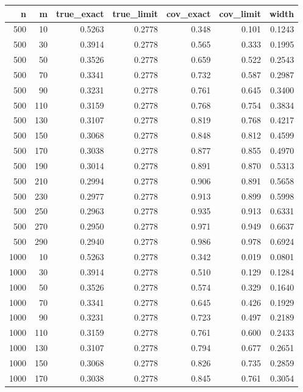 \begin{tabular}{rrrrrrr}
  \hline
n & m & true\_exact & true\_limit & cov\_exact & cov\_limit & width \\ 
  \hline
500 & 10 & 0.5263 & 0.2778 & 0.348 & 0.101 & 0.1243 \\ 
  500 & 30 & 0.3914 & 0.2778 & 0.565 & 0.333 & 0.1995 \\ 
  500 & 50 & 0.3526 & 0.2778 & 0.659 & 0.522 & 0.2543 \\ 
  500 & 70 & 0.3341 & 0.2778 & 0.732 & 0.587 & 0.2987 \\ 
  500 & 90 & 0.3231 & 0.2778 & 0.761 & 0.645 & 0.3400 \\ 
  500 & 110 & 0.3159 & 0.2778 & 0.768 & 0.754 & 0.3834 \\ 
  500 & 130 & 0.3107 & 0.2778 & 0.819 & 0.768 & 0.4217 \\ 
  500 & 150 & 0.3068 & 0.2778 & 0.848 & 0.812 & 0.4599 \\ 
  500 & 170 & 0.3038 & 0.2778 & 0.877 & 0.855 & 0.4970 \\ 
  500 & 190 & 0.3014 & 0.2778 & 0.891 & 0.870 & 0.5313 \\ 
  500 & 210 & 0.2994 & 0.2778 & 0.906 & 0.891 & 0.5658 \\ 
  500 & 230 & 0.2977 & 0.2778 & 0.913 & 0.899 & 0.5998 \\ 
  500 & 250 & 0.2963 & 0.2778 & 0.935 & 0.913 & 0.6331 \\ 
  500 & 270 & 0.2950 & 0.2778 & 0.971 & 0.949 & 0.6637 \\ 
  500 & 290 & 0.2940 & 0.2778 & 0.986 & 0.978 & 0.6924 \\ 
  1000 & 10 & 0.5263 & 0.2778 & 0.342 & 0.019 & 0.0801 \\ 
  1000 & 30 & 0.3914 & 0.2778 & 0.510 & 0.129 & 0.1284 \\ 
  1000 & 50 & 0.3526 & 0.2778 & 0.574 & 0.329 & 0.1640 \\ 
  1000 & 70 & 0.3341 & 0.2778 & 0.645 & 0.426 & 0.1929 \\ 
  1000 & 90 & 0.3231 & 0.2778 & 0.723 & 0.497 & 0.2189 \\ 
  1000 & 110 & 0.3159 & 0.2778 & 0.761 & 0.600 & 0.2433 \\ 
  1000 & 130 & 0.3107 & 0.2778 & 0.794 & 0.677 & 0.2651 \\ 
  1000 & 150 & 0.3068 & 0.2778 & 0.826 & 0.735 & 0.2859 \\ 
  1000 & 170 & 0.3038 & 0.2778 & 0.845 & 0.761 & 0.3054 \\ 

\end{tabular}
